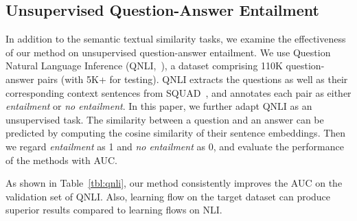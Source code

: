 \documentclass[11pt,a4paper]{article}
\begin{document}
\vspace{-5pt}
\subsection{Unsupervised Question-Answer Entailment}
\vspace{-5pt}
In addition to the semantic textual similarity tasks, we  examine the effectiveness of our method on unsupervised question-answer entailment. We use Question Natural Language Inference (QNLI,~\citet{wang2018glue}), a dataset comprising 110K question-answer pairs (with 5K+ for testing). QNLI extracts the questions as well as their corresponding context sentences from SQUAD~\citep{rajpurkar2016squad}, and annotates each pair as either \textit{entailment} or \textit{no entailment}. 
In this paper, we further adapt QNLI as an unsupervised task. The similarity between a question and an answer can be predicted by computing the cosine similarity of their sentence embeddings. Then we regard \textit{entailment} as 1 and \textit{no entailment} as 0, and evaluate the performance of the methods with AUC.



As shown in Table~\ref{tbl:qnli}, our method consistently improves the AUC on the validation set of QNLI. Also, learning flow on the target dataset can produce superior results compared to learning flows on NLI. 















\begin{table}[!h]
\centering
{}
\caption{AUC on QNLI evaluated on the validation set. : Use NLI corpus for the unsupervised training of flow; supervision labels of NLI are NOT visible.}
\label{tbl:qnli}
\vspace{-10pt}
\end{table}
\end{document}
